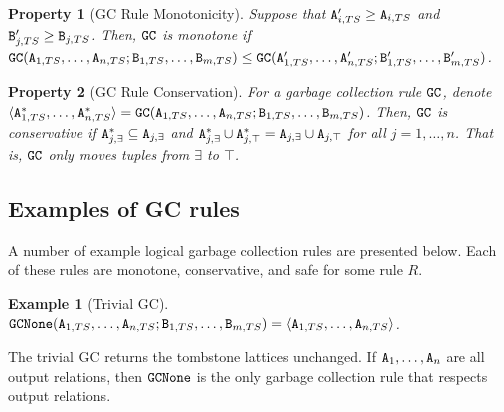 \documentclass{article}
\numberwithin{equation}{section}
\newtheorem{example}{Example}[section]
\newtheorem{property}{Property}[section]
\renewcommand{\tt}[1]{\ifmmode\text{\texttt{#1}}\else\texttt{#1}\fi}
\begin{document}
\begin{property}[GC Rule Monotonicity]
Suppose that $\tt{A}'_{i,TS} \geq \tt{A}_{i,TS}$ and $\tt{B}'_{j,TS} \geq \tt{B}_{j,TS}$.
Then, $\tt{GC}$ is \emph{monotone} if $\tt{GC}(\tt{A}_{1,TS}, \dots, \tt{A}_{n,TS}; \tt{B}_{1,TS}, \dots, \tt{B}_{m,TS}) \leq \tt{GC}(\tt{A}'_{1,TS}, \dots, \tt{A}'_{n,TS}; \tt{B}'_{1,TS}, \dots, \tt{B}'_{m,TS})$.
\end{property}

\begin{property}[GC Rule Conservation]
\label{property:gc_conservative}
For a garbage collection rule $\tt{GC}$, denote
$\langle \tt{A}_{1,TS}^*, \dots, \tt{A}_{n,TS}^* \rangle = \tt{GC}(\tt{A}_{1,TS}, \dots, \tt{A}_{n,TS}; \tt{B}_{1,TS}, \dots, \tt{B}_{m,TS})$.
Then, $\tt{GC}$ is \emph{conservative} if $\tt{A}_{j,\exists}^* \subseteq \tt{A}_{j,\exists}$ and $\tt{A}_{j,\exists}^* \cup \tt{A}_{j,\top}^* = \tt{A}_{j,\exists} \cup \tt{A}_{j,\top}$ for all $j=1,\dots,n$.
That is, $\tt{GC}$ only moves tuples from $\exists$ to $\top$.
\end{property}

\subsection{Examples of GC rules}
\label{sec:logical:example}
A number of example logical garbage collection rules are presented below.
Each of these rules are monotone, conservative, and safe for some rule $R$.
\begin{example}[Trivial GC]
$\tt{GCNone}(\tt{A}_{1,TS}, \dots, \tt{A}_{n,TS}; \tt{B}_{1,TS}, \dots, \tt{B}_{m,TS}) = \langle \tt{A}_{1,TS}, \dots, \tt{A}_{n,TS} \rangle$.
\end{example}
The trivial GC returns the tombstone lattices unchanged.
If $\tt{A}_1, \dots, \tt{A}_n$ are all output relations, then $\tt{GCNone}$ is the only garbage collection rule that respects output relations.
\end{document}
